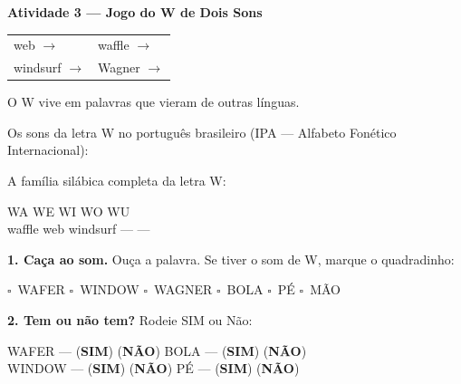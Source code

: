 \begin{consolidacao}
\textbf{Atividade 3 --- Jogo do W de Dois Sons}


\begin{center}
\begin{tabular}{ll}
web \quad $\rightarrow$ \underline{\hspace{2cm}} & waffle \quad $\rightarrow$ \underline{\hspace{2cm}} \\
windsurf \quad $\rightarrow$ \underline{\hspace{2cm}} & Wagner \quad $\rightarrow$ \underline{\hspace{2cm}}
\end{tabular}
\end{center}
O W vive em palavras que vieram de outras l\'inguas.

\end{consolidacao}


\begin{sonsdaletra}
Os sons da letra W no portugu\^es{} brasileiro (IPA --- Alfabeto Fon\'etico Internacional):

\end{sonsdaletra}


\begin{familiasilabica}
A fam\'ilia sil\'abica completa da letra W:

\begin{center}
WA \quad WE \quad WI \quad WO \quad WU \\[0.5em] waffle \quad web \quad windsurf \quad --- \quad ---
\end{center}
\end{familiasilabica}


\begin{somletra}
\textbf{1. Ca\c{c}a ao som.} Ou\c{c}a a palavra. Se tiver o som de W, marque o quadradinho:
\begin{center}
$\square$~WAFER \quad $\square$~WINDOW \quad $\square$~WAGNER \quad $\square$~BOLA \quad $\square$~P\'E \quad $\square$~M\~AO
\end{center}

\textbf{2. Tem ou n\~ao{} tem?} Rodeie SIM ou N\~ao:
\begin{center}
WAFER --- (\textbf{SIM}) (\textbf{N\~AO}) \quad BOLA --- (\textbf{SIM}) (\textbf{N\~AO}) \\ WINDOW --- (\textbf{SIM}) (\textbf{N\~AO}) \quad P\'E --- (\textbf{SIM}) (\textbf{N\~AO})
\end{center}
\end{somletra}

